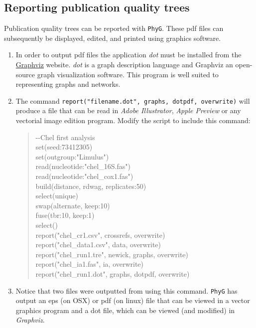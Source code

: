 \documentclass[]{article}
\newcommand{\phyg}{\texttt{PhyG} }
\begin{document}
\subsection{Reporting publication quality trees}
\label{subsec:dotpdf}

Publication quality trees can be reported with \texttt{PhyG}. These pdf files can  
subsequently be displayed, edited, and printed using graphics software.

\begin{enumerate}

\item In order to output pdf files the application \textit{dot} must be installed from 
the \href{https://graphviz.org/download/}{Graphviz} website. \textit{dot} is a graph 
description language and Graphviz an open-source graph visualization software. 
This program is well suited to representing graphs and networks.

\item  The command \texttt{report("filename.dot", graphs, dotpdf, overwrite)} will 
produce a file that can be read in \textit{Adobe Illustrator}, \textit{Apple Preview} 
or any vectorial image edition program. Modify the script to include this command:

	\begin{quote}
	-\/-Chel first analysis\\
	set(seed:73412305)\\
	set(outgroup:"Limulus")\\
	read(nucleotide:"chel\_16S.fas")\\
	read(nucleotide:"chel\_cox1.fas")\\
	build(distance, rdwag, replicates:50)\\
	select(unique)\\
	swap(alternate, keep:10)\\
	fuse(tbr:10, keep:1)\\
	select()\\
	report("chel\_cr1.csv", crossrefs, overwrite)\\
	report("chel\_data1.csv", data, overwrite)\\
	report("chel\_run1.tre", newick, graphs, overwrite)\\
	report("chel\_ia1.fas", ia, overwrite)\\
	report("chel\_run1.dot", graphs, dotpdf, overwrite)\\
	\end{quote}
	
\item Notice that two files were outputted from using this command. \phyg has 
output an eps (on OSX) or pdf (on linux) file that can be viewed in a vector graphics 
program and a dot file, which can be viewed (and modified) in \textit{Graphviz}.
\end{enumerate}
\end{document}
